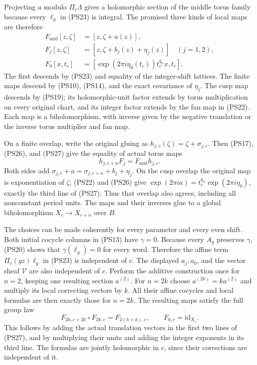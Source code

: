 Projecting $a$ modulo $\Pi_c\Lambda$ gives a holomorphic section of
the middle torus family because every $\ell_g$ in (PS23) is integral.
The promised three kinds of local maps are therefore
\[
\begin{aligned}
 F_{\mathrm{mid}}[z,\zeta]&=[z,\zeta+a(z)],\\
 F_j[z,\zeta]&=[z,\zeta+b_j(z)+\eta_j(z)]\quad(j=1,2),\\
 F_0[x,t_c]&=[\exp(2\pi i\eta_0(t_c))t_c^{q_n}x,t_c].
\end{aligned}
\tag{PS27}\label{pshift:eq:full-isomorphism}
\]
The first descends by (PS23) and equality of the integer-shift
lattices. The finite maps descend by (PS10), (PS14), and the exact
covariance of $\eta_j$. The cusp map descends by (PS19); its
holomorphic-unit factor extends by torus multiplication on every
original chart, and its integer factor extends by the fan map in
(PS22). Each map is a biholomorphism, with inverse given by the
negative translation or the inverse torus multiplier and fan map.

On a finite overlap, write the original gluing as
$h_{j,c}(\zeta)=\zeta+\sigma_{j,c}$. Then (PS17), (PS26), and
(PS27) give the equality of actual torus maps
\[
                     h_{j,c+n}F_j=F_{\mathrm{mid}}h_{j,c}.
 \tag{PS28}\label{pshift:eq:finite-overlap-identity}
\]
Both sides add
$\sigma_{j,c}+a=\sigma_{j,c+n}+b_j+\eta_j$.
On the cusp overlap the original map is exponentiation of $\zeta$;
(PS22) and (PS26) give
$\exp(2\pi ia)=t_c^{q_n}\exp(2\pi i\eta_0)$, exactly the
third line of (PS27). Thus that overlap also agrees, including
all nonconstant period units. The maps and their inverses glue to
a global biholomorphism $X_c\to X_{c+n}$ over $B$.

The choices can be made coherently for every parameter and every even
shift. Both initial cocycle columns in (PS13) have $\gamma=0$.
Because every $A_g$ preserves $\gamma$, (PS20) shows that
$\gamma(\ell_g)=0$ for every word. Therefore the affine term
$\Pi_c(gz)\ell_g$ in (PS23) is independent of $c$. The displayed
$a_j,a_0$, and the vector sheaf $\mathscr V$ are also independent
of $c$. Perform the additive construction once for $n=2$, keeping
one resulting section $a^{(2)}$. For $n=2k$ choose
$a^{(2k)}=k a^{(2)}$ and multiply its local correcting vectors by
$k$. All their affine cocycles and local formulas are then exactly
those for $n=2k$. The resulting maps satisfy the full group law
\[
 F_{2h,c+2k}\circ F_{2k,c}=F_{2(h+k),c},\qquad
                 F_{0,c}=\mathrm{id}_{X_c}.
 \tag{PS28a}\label{pshift:eq:coherent-shift-action}
\]
This follows by adding the actual translation vectors in the first
two lines of (PS27), and by multiplying their units and adding the
integer exponents in its third line. The formulas are jointly
holomorphic in $c$, since their corrections are independent of it.

